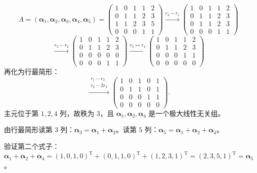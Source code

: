 \[
A=(\boldsymbol{\alpha}_1,\boldsymbol{\alpha}_2,\boldsymbol{\alpha}_3,\boldsymbol{\alpha}_4,\boldsymbol{\alpha}_5)
=\begin{pmatrix}
1&0&1&1&2\\
0&1&1&2&3\\
1&1&2&3&5\\
0&0&0&1&1
\end{pmatrix}
\xrightarrow{r_3-r_1}
\begin{pmatrix}
1&0&1&1&2\\
0&1&1&2&3\\
0&1&1&2&3\\
0&0&0&1&1
\end{pmatrix}
\]
\[
\xrightarrow{r_3-r_2}
\begin{pmatrix}
1&0&1&1&2\\
0&1&1&2&3\\
0&0&0&0&0\\
0&0&0&1&1
\end{pmatrix}
\xrightarrow{r_3\leftrightarrow r_4}
\begin{pmatrix}
1&0&1&1&2\\
0&1&1&2&3\\
0&0&0&1&1\\
0&0&0&0&0
\end{pmatrix}
\]
再化为行最简形：
\[
\xrightarrow{\substack{r_1-r_3\\ r_2-2r_3}}
\begin{pmatrix}
1&0&1&0&1\\
0&1&1&0&1\\
0&0&0&1&1\\
0&0&0&0&0
\end{pmatrix}.
\]
主元位于第 $1,2,4$ 列，故秩为 $3$，且 $\boldsymbol{\alpha}_1,\boldsymbol{\alpha}_2,\boldsymbol{\alpha}_4$ 是一个极大线性无关组。

由行最简形读第 $3$ 列：$\boldsymbol{\alpha}_3=\boldsymbol{\alpha}_1+\boldsymbol{\alpha}_2$。读第 $5$ 列：$\boldsymbol{\alpha}_5=\boldsymbol{\alpha}_1+\boldsymbol{\alpha}_2+\boldsymbol{\alpha}_4$。

验证第二个式子：$\boldsymbol{\alpha}_1+\boldsymbol{\alpha}_2+\boldsymbol{\alpha}_4=(1,0,1,0)^\mathrm{T}+(0,1,1,0)^\mathrm{T}+(1,2,3,1)^\mathrm{T}=(2,3,5,1)^\mathrm{T}=\boldsymbol{\alpha}_5$。

\else \answerarea[10] \fi%

